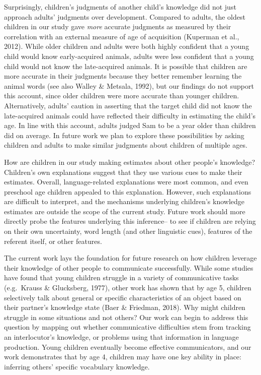 \documentclass[10pt, letterpaper]{article}
\begin{document}
Surprisingly, children's judgments of another child's knowledge did not
just approach adults' judgments over development. Compared to adults,
the oldest children in our study gave \emph{more} accurate judgments as
measured by their correlation with an external measure of age of
acquisition (Kuperman et al., 2012). While older children and adults
were both highly confident that a young child would know early-acquired
animals, adults were less confident that a young child would not know
the late-acquired animals. It is possible that children are more
accurate in their judgments because they better remember learning the
animal words (see also Walley \& Metsala, 1992), but our findings do not
support this account, since older children were more accurate than
younger children. Alternatively, adults' caution in asserting that the
target child did not know the late-acquired animals could have reflected
their difficulty in estimating the child's age. In line with this
account, adults judged Sam to be a year older than children did on
average. In future work we plan to explore these possibilities by asking
children and adults to make similar judgments about children of multiple
ages.

How are children in our study making estimates about other people's
knowledge? Children's own explanations suggest that they use various
cues to make their estimates. Overall, language-related explanations
were most common, and even preschool age children appealed to this
explanation. However, such explanations are difficult to interpret, and
the mechanisms underlying children's knowledge estimates are outside the
scope of the current study. Future work should more directly probe the
features underlying this inference-- to see if children are relying on
their own uncertainty, word length (and other linguistic cues), features
of the referent itself, or other features.

The current work lays the foundation for future research on how children
leverage their knowledge of other people to communicate successfully.
While some studies have found that young children struggle in a variety
of communicative tasks (e.g.~Krauss \& Glucksberg, 1977), other work has
shown that by age 5, children selectively talk about general or specific
characteristics of an object based on their partner's knowledge state
(Baer \& Friedman, 2018). Why might children struggle in some situations
and not others? Our work can begin to address this question by mapping
out whether communicative difficulties stem from tracking an
interlocutor's knowledge, or problems using that information in language
production. Young children eventually become effective communicators,
and our work demonstrates that by age 4, children may have one key
ability in place: inferring others' specific vocabulary knowledge.
\end{document}
